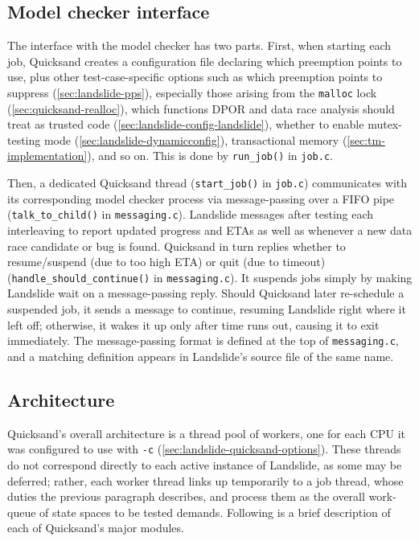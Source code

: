 \subsection{Model checker interface}
\label{sec:quicksand-impl-mc}

The interface with the model checker has two parts.
First, when starting each job, Quicksand creates a configuration file declaring which preemption points to use,
plus other test-case-specific options such as
which preemption points to suppress (\cref{sec:landslide-pps}),
especially those arising from the {\tt malloc} lock (\cref{sec:quicksand-realloc}),
which functions DPOR and data race analysis should treat as trusted code (\cref{sec:landslide-config-landslide}),
whether to enable mutex-testing mode (\cref{sec:landslide-dynamicconfig}),
transactional memory (\cref{sec:tm-implementation}),
and so on.
This is done by {\tt run\_job()} in {\tt job.c}.

Then, a dedicated Quicksand thread
({\tt start\_job()} in {\tt job.c})
communicates with its corresponding model checker process via message-passing
over a FIFO pipe %
({\tt talk\_to\_\allowbreak{}child()} in {\tt messaging.c}).
Landslide messages after testing each interleaving to report updated progress and ETAs
as well as whenever a new data race candidate or bug is found.
Quicksand in turn replies whether to resume/suspend (due to too high ETA) or quit (due to timeout)
({\tt handle\_should\_continue()} in {\tt messaging.c}).
It suspends jobs simply by making Landslide wait on a message-passing reply.
Should Quicksand later re-schedule a suspended job, it sends a message to continue,
resuming Landslide right where it left off;
otherwise, it wakes it up only after time runs out, causing it to exit immediately.
The message-passing format is defined at the top of {\tt messaging.c},
and a matching definition appears in Landslide's source file of the same name.

\subsection{Architecture}

Quicksand's overall architecture is a thread pool of workers,
one for each CPU it was configured to use with {\tt -c} (\cref{sec:landslide-quicksand-options}).
These threads do not correspond directly to each active instance of Landslide,
as some may be deferred;
rather, each worker thread links up temporarily to a job thread, whose duties the previous paragraph describes,
and process them as the overall work-queue of state spaces to be tested demands.
Following is a brief description of each of Quicksand's major modules.

